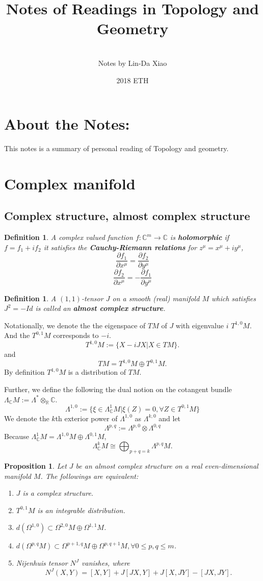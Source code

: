 \documentclass[11pt]{article}
\title{\bf Notes of Readings in Topology and Geometry}
\author{\\
Notes by Lin-Da Xiao}
\date{2018 ETH} %
\newtheorem{prop}[thm]{Proposition}
\newtheorem{dfn}[thm]{Definition}
\newcommand{\reals}{\mathbb R}
\newcommand{\cplx}{\mathbb C}
\newcommand{\pd}{{\partial}}
\newcommand{\lrta}{\longrightarrow}
\begin{document}
\maketitle
\tableofcontents
\newpage

\section*{About the Notes:}
This notes is a summary of personal reading  of Topology and geometry.
\section{Complex manifold}
\subsection{Complex structure, almost complex structure}
\begin{dfn}
A complex valued function $f:\cplx^m\lrta\cplx$ is \textbf{holomorphic} if  $f=f_1+i f_2$ it satisfies the \textbf{Cauchy-Riemann relations} for $z^\mu=x^\mu+i y^\mu$,
$$
\frac{\pd f_1}{\pd x^\mu}=\frac{\pd f_2}{\pd y^{\mu}}
$$
$$
\frac{\pd f_2}{\pd x^\mu}=-\frac{\pd f_1}{\pd y^{\mu}}
$$
\end{dfn}
\begin{dfn}
A $(1,1)$-tensor $J$ on a smooth (real) manifold $M$ which satisfies $J^2=-Id$ is called an \textbf{almost complex structure}.
\end{dfn}
Notationally, we denote the the eigenspace of $TM$ of $J$ with eigenvalue $i$ $T^{1,0}M$. And the $T^{0,1}M$ corresponds to $-i$.
$$
T^{1,0}M:=\{X-iJ X| X\in TM\}.
$$
and
$$
TM=T^{1,0}M\oplus T^{0,1}M.
$$
By definition $T^{1,0}M$ is a distribution of $TM$.

Further, we define the following the dual notion on the cotangent bundle $\Lambda_\cplx M:=\Lambda^*\otimes_\reals \cplx$.  
$$
\Lambda^{1,0}:=\{\xi\in \Lambda^1_\cplx M|\xi(Z)=0,\forall Z\in T^{0,1}M\}
$$
We denote the $k$th exterior power of $\Lambda^{1,0}$ as $\Lambda^{k,0}$ and let $$
\Lambda^{p,q}:=\Lambda^{p,0}\otimes\Lambda^{0,q}
$$
Because $\Lambda_\cplx^1M=\Lambda^{1,0}M\oplus \Lambda^{0,1}M$,  
$$
\Lambda^k_\cplx M\cong\bigoplus_{p+q=k} \Lambda^{p,q}M.
$$
\begin{prop}
Let $J$ be an almost complex structure on a real even-dimensional manifold $M$. The followings are equivalent:
\begin{enumerate}
\item $J$ is a complex structure.
\item $T^{0,1}M$ is an integrable distribution.
\item $d(\Omega^{1,0})\subset \Omega^{2,0}M\oplus \Omega^{1,1}M$.
\item $d(\Omega^{p,q}M)\subset \Omega^{p+1,q}M\oplus \Omega^{p,q+1}M,\forall 0\leq p,q\leq m$.
\item Nijenhuis tensor $N^J$ vanishes, where 
$$
N^J(X,Y)=[X,Y]+J[JX,Y]+J[X,JY]-[JX,JY].
$$
\end{enumerate}
\end{prop}
\end{document}

